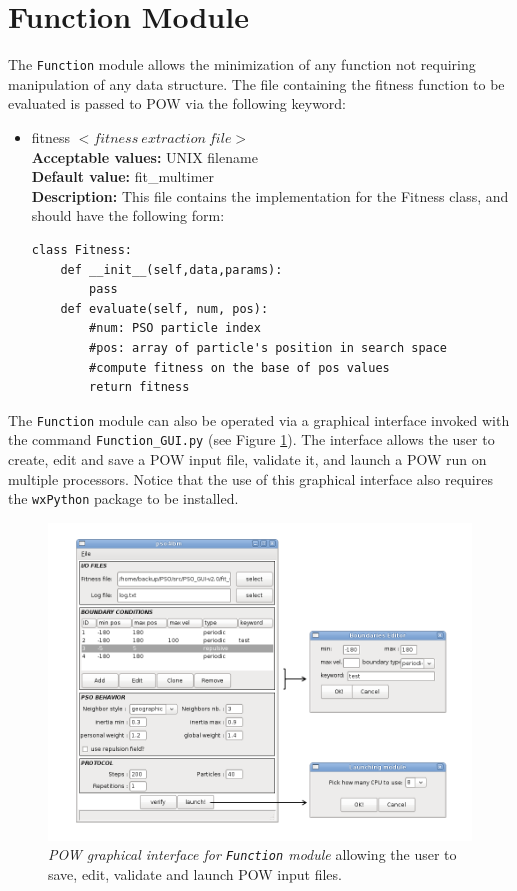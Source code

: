 \documentclass[a4paper, 12pt]{article}
\begin{document}
\section{Function Module}

The \texttt{Function} module allows the minimization of any function not requiring manipulation of any data structure. The file containing the fitness function to be evaluated is passed to POW via the following keyword:

\begin{itemize}
\item fitness $< fitness\ extraction\ file >$\\
\textbf{Acceptable values:} UNIX filename\\
\textbf{Default value:} fit\_multimer\\
\textbf{Description:} This file contains the implementation for the Fitness class, and should have the following form:
\begin{verbatim}
class Fitness:
    def __init__(self,data,params):
        pass
    def evaluate(self, num, pos):
        #num: PSO particle index
        #pos: array of particle's position in search space 
        #compute fitness on the base of pos values
        return fitness
\end{verbatim}
\end{itemize}

The \texttt{Function} module can also be operated via a graphical interface invoked with the command \texttt{Function\_GUI.py} (see Figure \ref{psoGui}).
The interface allows the user to create, edit and save a POW input file, validate it, and launch a POW run on multiple processors.
Notice that the use of this graphical interface also requires the \texttt{wxPython} package to be installed.

\begin{figure}[htp!]
\centering
\includegraphics[scale=0.5]{powGui.png}
\caption{\emph{POW graphical interface for \texttt{Function} module} allowing the user to save, edit, validate and launch POW input files.}
\label{psoGui}
\end{figure}
\end{document}
